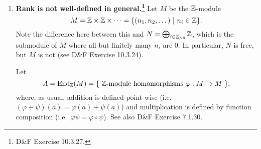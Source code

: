 \documentclass[11pt, reqno]{amsart}
\theoremstyle{plain}
\theoremstyle{definition}
\theoremstyle{example}
\def\End{\mathrm{End}}
\def\f{\varphi}
\begin{document}
\begin{enumerate}[1.]
\begin{enumerate}
\begin{proof}
Suppose $A$ is is a commutative ring with $1$ and suppose that $A^m \cong A^n$. Let $I$ be a maximal ideal of $A$. Since $A^m \cong A^n$, we have that $IA^m \cong IA^n$, and so $A^m/IA^m \cong A^n/IA^n$. Moreover, on Q3, we proved that for a free module $M$ over a ring $A$ with basis $\mathcal{B}$ and ideal $I$, we have that,
\begin{align*}
M/IM \cong \bigoplus_{b \in \mathcal{B}} Ab/Ib
\end{align*}

If we fix $A$ as our ring with $A^m, A^n$ as the free modules over this ring, we can apply this result as follows,
\begin{align*}
A^m/IA^m &\cong \oplus_{b \in \mathcal{B}} Ab/Ib\\
A^n/IA^n &\cong \oplus_{c \in \mathcal{C}} Ac/Ic
\end{align*}

Thus, we have that $\oplus_{b \in \mathcal{B}} Ab/Ib \cong \oplus_{c \in \mathcal{C}} Ac/Ic$. Since $\oplus_{b \in \mathcal{B}} Ab/Ib$ is $|\mathcal{B}|$-dimensional and $\oplus_{c \in \mathcal{C}} Ac/Ic$ is $|\mathcal{C}|$-dimensional, we must have that $|\mathcal{B}| = |\mathcal{C}|$. But note that $\mathcal{B}$ is a basis for $A^m$ and $\mathcal{C}$ is a basis for $A^n$. We know that $A^m$ must have a basis of size $m$ and $A^n$ must have a basis of size $n$, so let us take $\mathcal{B}$ and $\mathcal{C}$ to be of these sizes, respectively. Thus, we have that $|\mathcal{B}| = |\mathcal{C}|$ implies that $n = m$, as required.\\

Now suppose $n = m$. Then we must have $A^m = A^n$ and so $A^m \cong A^n$ by the identity map.
\end{proof}

\item \textbf{Rank is not well-defined in general.\footnote{D\&F Exercise 10.3.27.} }
Let $M$ be the $\mathbb{Z}$-module  
$$M = \mathbb{Z} \times \mathbb{Z} \times \cdots 
	= \{(n_1, n_2, \dots ) ~|~ n_i \in \mathbb{Z}\}.$$
Note the difference here between this and  $N = \bigoplus_{i \in \mathbb{Z}_{>0}} \mathbb{Z}$, which is the submodule of $M$ where all but finitely many $n_i$ are 0. In particular, $N$ is free, but $M$ is not (see D\&F Exercise 10.3.24). 

Let 
$$A = \End_\ZZ(M) = \{ \text{ $\ZZ$-module homomorphisms $\f: M \to M$ }\},$$
where, as usual, addition is defined point-wise (i.e.\ $(\f + \psi)(a) = \f(a) + \psi(a)$) and multiplication is defined by function composition (i.e.\ $\f\psi = \f \circ \psi$). See also D\&F Exercise 7.1.30. 


\end{enumerate}
\end{enumerate}
\end{document}
